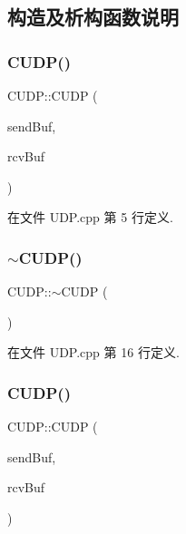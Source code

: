 \subsection{构造及析构函数说明}
\mbox{\label{class_c_u_d_p_a2eed7862494fbdc41005e5f536d2f74f}} 
\subsubsection{\texorpdfstring{C\+U\+D\+P()}{CUDP()}\hspace{0.1cm}{\footnotesize\ttfamily [1/2]}}
{\footnotesize\ttfamily C\+U\+D\+P\+::\+C\+U\+DP (\begin{DoxyParamCaption}\item[{\hyperlink{class_msg_list}{Msg\+List} \&}]{send\+Buf,  }\item[{\hyperlink{class_msg_list}{Msg\+List} \&}]{rcv\+Buf }\end{DoxyParamCaption})}



在文件 U\+D\+P.\+cpp 第 5 行定义.

\mbox{\label{class_c_u_d_p_aa5e4b24a48885c739893d60ffb10672f}} 
\subsubsection{\texorpdfstring{$\sim$\+C\+U\+D\+P()}{~CUDP()}\hspace{0.1cm}{\footnotesize\ttfamily [1/2]}}
{\footnotesize\ttfamily C\+U\+D\+P\+::$\sim$\+C\+U\+DP (\begin{DoxyParamCaption}{ }\end{DoxyParamCaption})}



在文件 U\+D\+P.\+cpp 第 16 行定义.

\mbox{\label{class_c_u_d_p_a2eed7862494fbdc41005e5f536d2f74f}} 
\subsubsection{\texorpdfstring{C\+U\+D\+P()}{CUDP()}\hspace{0.1cm}{\footnotesize\ttfamily [2/2]}}
{\footnotesize\ttfamily C\+U\+D\+P\+::\+C\+U\+DP (\begin{DoxyParamCaption}\item[{\hyperlink{class_msg_list}{Msg\+List} \&}]{send\+Buf,  }\item[{\hyperlink{class_msg_list}{Msg\+List} \&}]{rcv\+Buf }\end{DoxyParamCaption})}

